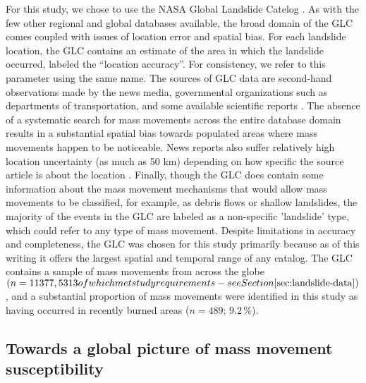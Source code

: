 \documentclass[nhess, manuscript]{copernicus}
\begin{document}
For this study, we chose to use the NASA Global Landslide Catelog
\citep[GLC,][]{kirschbaumGlobalLandslideCatalog2010}. As with the few 
other regional and global databases available, the broad domain of the 
GLC comes coupled with issues of location error and spatial bias. For 
each landslide location, the GLC contains an estimate of the area in 
which the landslide occurred, labeled the “location accuracy”. For 
consistency, we refer to this parameter using the same name. The sources of GLC data are
second-hand observations made by the news media, governmental
organizations such as departments of transportation, and some available
scientific reports \citep{kirschbaumGlobalLandslideCatalog2010}. The absence of a
systematic search for mass movements across the entire database domain
results in a substantial spatial bias towards populated areas where
mass movements happen to be noticeable. News reports also suffer relatively
high location uncertainty (as much as 50 km) depending on how specific the
source article is about the location \citep{kirschbaumGlobalLandslideCatalog2010}. Finally,
though the GLC does contain some information about the mass movement
mechanisms that would allow mass movements to be classified, for example, as
debris flows or shallow landslides, the majority of the events in the GLC are labeled as a non-specific 'landslide' type, which could refer to any type of mass movement.  Despite limitations in accuracy
and completeness, the GLC was
chosen for this study primarily because as of this writing it offers the largest spatial and
temporal range of any catalog. The GLC contains a
sample of mass movements from across the globe
\((n=11377, 5313 of which met study requirements - see Section \ref{sec:landslide-data})\), and a substantial proportion of mass movements were identified in
this study as having occurred in recently burned areas (\(n=489\); \(9.2\,\%\)).


\subsection{Towards a global picture of mass movement
susceptibility}\label{toward-a-global-picture-of-global-landslides-susceptibility}
\end{document}
